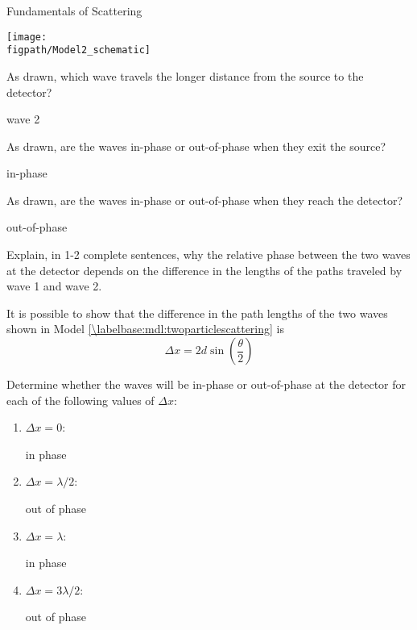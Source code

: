 \begin{activity}{Fundamentals of Scattering}
\begin{model}
	\vspace{6pt}
	\centerline{\texttt{[image: \\figpath/Model2\_schematic]}}
	
\end{model}

\begin{ctqs}

	\question As drawn, which wave travels the longer distance from the source to the detector?
	
		\begin{solution}[0.25in]
			wave 2
		\end{solution}
	
	\question As drawn, are the waves in-phase or out-of-phase when they exit the source?
	
		\begin{solution}[0.25in]
			in-phase
		\end{solution}
	
	\question As drawn, are the waves in-phase or out-of-phase when they reach the detector?
	
		\begin{solution}[0.25in]
			out-of-phase
		\end{solution}
	
	\question Explain, in 1-2 complete sentences, why the relative phase between the two waves at the detector depends on the difference in the lengths of the paths traveled by wave 1 and wave 2.
	
		\begin{solution}[1.5in]
		\end{solution}
	
	\question It is possible to show %
		that the difference in the path lengths of the two waves shown in Model \ref{\labelbase:mdl:twoparticlescattering} is
		\begin{equation*}
			\Delta x = 2 d \sin\left(\frac{\theta}{2}\right)
		\end{equation*}
		
		Determine whether the waves will be in-phase or out-of-phase at the detector for each of the following values of $\Delta x$:
		
		\begin{enumerate}
			\item $\Delta x = 0$:
				\begin{solution}[0.25in]
					in phase
				\end{solution}
			\item $\Delta x = \lambda/2$:
				\begin{solution}[0.25in]
					out of phase
				\end{solution}
			\item $\Delta x = \lambda$:
				\begin{solution}[0.25in]
					in phase
				\end{solution}
			\item $\Delta x = 3\lambda/2$:
				\begin{solution}[0.25in]
					out of phase
				\end{solution}
		\end{enumerate}
		

\end{ctqs}
\end{activity}
